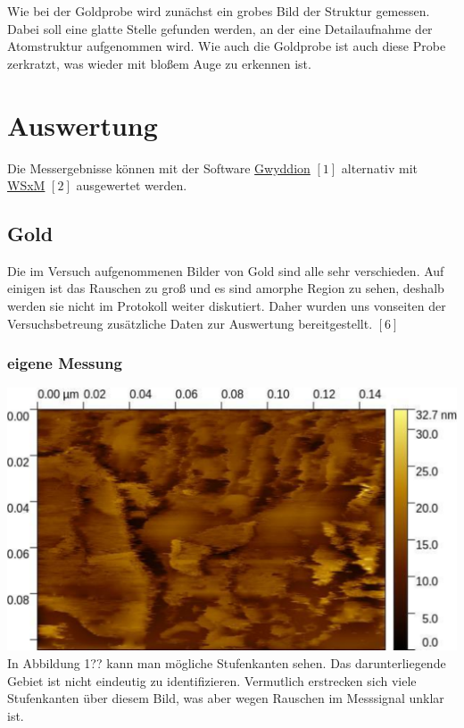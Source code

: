 \documentclass[12pt,a4paper]{scrartcl}
\numberwithin{equation}{section} %
\begin{document}
Wie bei der Goldprobe wird zunächst ein grobes Bild der Struktur
gemessen. Dabei soll eine glatte Stelle gefunden werden, an der eine
Detailaufnahme der Atomstruktur aufgenommen wird. Wie auch die Goldprobe
ist auch diese Probe zerkratzt, was wieder mit bloßem Auge zu erkennen
ist.

\hypertarget{auswertung}{%
\section{Auswertung}\label{auswertung}}

Die Messergebnisse können mit der Software
\href{http://gwyddion.net}{Gwyddion} $[1]$ alternativ mit
\href{http://www.wsxm.eu}{WSxM} $[2]$ ausgewertet werden.

\hypertarget{gold-1}{%
\subsection{Gold}\label{gold-1}}

Die im Versuch aufgenommenen Bilder von Gold sind alle sehr verschieden.
Auf einigen ist das Rauschen zu groß und es sind amorphe Region zu
sehen, deshalb werden sie nicht im Protokoll weiter diskutiert. Daher
wurden uns vonseiten der Versuchsbetreung zusätzliche Daten zur
Auswertung bereitgestellt. $[6]$

\hypertarget{eigene-messung}{%
\subsubsection{eigene Messung}\label{eigene-messung}}

\includegraphics{../media/B2.5/Gold_gross.pdf} In Abbildung 1?? kann man mögliche
Stufenkanten sehen. Das darunterliegende Gebiet ist nicht eindeutig zu
identifizieren. Vermutlich erstrecken sich viele Stufenkanten über
diesem Bild, was aber wegen Rauschen im Messsignal unklar ist.
\end{document}
